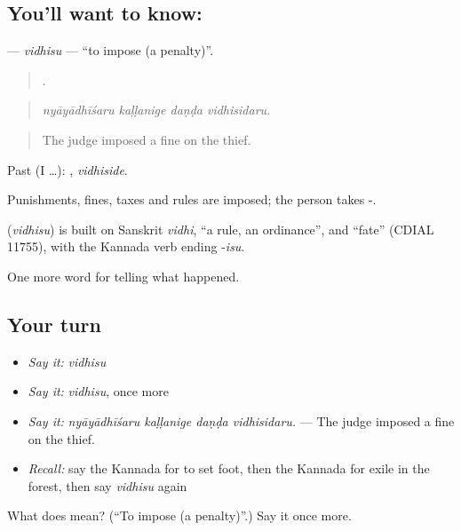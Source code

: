 \subsection*{You'll want to know: }
\textbf{} — \emph{vidhisu} — \textquotedblleft{}to impose (a penalty)\textquotedblright{}.

\begin{quote}
   .
\end{quote}

\begin{quote}
\emph{nyāyādhīśaru kaḷḷanige daṇḍa vidhisidaru.}
\end{quote}

\begin{quote}
The judge imposed a fine on the thief.
\end{quote}

Past (I …): , \emph{vidhiside}.

Punishments, fines, taxes and rules are imposed; the person takes -.

\begin{cousinweb}
\textbf{} (\emph{vidhisu}) is built on Sanskrit \emph{vidhi}, \textquotedblleft{}a rule, an ordinance\textquotedblright{}, and \textquotedblleft{}fate\textquotedblright{} (CDIAL 11755), with the Kannada verb ending -\emph{isu}.
\end{cousinweb}

\begin{grammarlens}[title={What you've built}]
One more word for telling what happened.
\end{grammarlens}

\subsection*{Your turn}
\begin{itemize}
\raggedright
  \item \emph{Say it:} \emph{vidhisu}
  \item \emph{Say it:} \emph{vidhisu}, once more
  \item \emph{Say it:} \emph{nyāyādhīśaru kaḷḷanige daṇḍa vidhisidaru.} — The judge imposed a fine on the thief.
  \item \emph{Recall:} say the Kannada for to set foot, then the Kannada for exile in the forest, then say \emph{vidhisu} again
\end{itemize}

\begin{tcolorbox}[breakable,colback=teal!4,colframe=teal!35!black,title={Before you move on}]
What does  mean? (\textquotedblleft{}To impose (a penalty)\textquotedblright{}.) Say it once more.
\end{tcolorbox}
